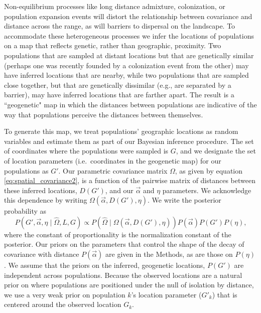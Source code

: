 \documentclass[12pt]{article}
\begin{document}
Non-equilibrium processes like long distance admixture, colonization, or population expansion events will distort the relationship between covariance and distance across the range, as will barriers to dispersal on the landscape. To accommodate these heterogeneous processes we infer the locations of populations on a map that reflects genetic, rather than geographic, proximity. Two populations that are sampled at distant locations but that are genetically similar (perhaps one was recently founded by a colonization event from the other) may have inferred locations that are nearby, while two populations that are sampled close together, but that are genetically dissimilar (e.g., are separated by a barrier), may have inferred locations that are farther apart. The result is a ``geogenetic" map in which the distances between populations are indicative of the way that populations perceive the distances between themselves.

To generate this map, we treat populations' geographic locations as random variables and estimate them as part of our Bayesian inference procedure.  The set of coordinates where the populations were sampled is $G$, and we designate the set of location parameters (i.e.\ coordinates in the geogenetic map) for our populations as $G'$. Our parametric covariance matrix $\Omega$, as given by equation \eqref{eq:spatial_covariance2}, is a function of the pairwise matrix of distances between these inferred locations, $D(G')$, and our $\vec{\alpha}$ and $\eta$ parameters.  We acknowledge this dependence by writing $\Omega(\vec{\alpha},{D}(G'),\eta)$.  We write the posterior probability as 
\begin{equation}
\label{eq:cyol_prob}
P \left( G', \vec{\alpha}, \eta \mid \widehat{\Omega}, L, G \right) \propto  
	P \left( \widehat{\Omega}  \mid \Omega(\vec{\alpha},{D}(G'),\eta ) \right) P(\vec{\alpha}) P(G') P(\eta) \text{,}
\end{equation}
where the constant of proportionality is the normalization constant of the posterior. Our priors on the parameters that control the shape of the decay of covariance with distance $P(\vec{\alpha})$ are given in the Methods, as are those on $P(\eta)$.  We assume that the priors on the inferred, geogenetic locations, $P(G')$ are independent across populations.  Because the observed locations are a natural prior on where populations are positioned under the null of isolation by distance, we use a very weak prior on population $k$'s location parameter ($G'_k$) that is centered around the observed location $G_k$.
  
\end{document}
